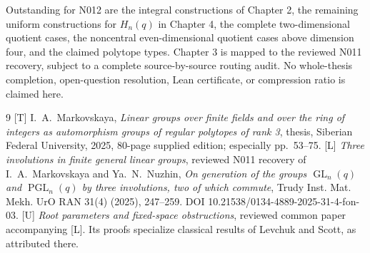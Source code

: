 \documentclass[11pt,a4paper]{article}
\newcommand{\GL}{\operatorname{GL}}
\newcommand{\PGL}{\operatorname{PGL}}
\begin{document}
Outstanding for N012 are the integral constructions of Chapter 2,
the remaining uniform constructions for $H_n(q)$ in Chapter 4,
the complete two-dimensional quotient cases, the noncentral
even-dimensional quotient cases above dimension four, and the
claimed polytope types. Chapter 3 is mapped to the reviewed N011
recovery, subject to a complete source-by-source routing audit.
No whole-thesis completion, open-question resolution, Lean
certificate, or compression ratio is claimed here.

\begin{thebibliography}{9}\small
{}[T] I.~A.~Markovskaya, \emph{Linear groups over finite fields
and over the ring of integers as automorphism groups of regular
polytopes of rank 3}, thesis, Siberian Federal University, 2025,
80-page supplied edition; especially pp.~53--75.
[L] \emph{Three involutions in finite general linear groups},
reviewed N011 recovery of I.~A.~Markovskaya and Ya.~N.~Nuzhin,
\emph{On generation of the groups $\GL_n(q)$ and $\PGL_n(q)$ by three
involutions, two of which commute}, Trudy Inst. Mat. Mekh. UrO RAN
31(4) (2025), 247--259. DOI 10.21538/0134-4889-2025-31-4-fon-03.
[U] \emph{Root parameters and fixed-space obstructions},
reviewed common paper accompanying [L]. Its proofs specialize
classical results of Levchuk and Scott, as attributed there.
\end{thebibliography}
\end{document}
